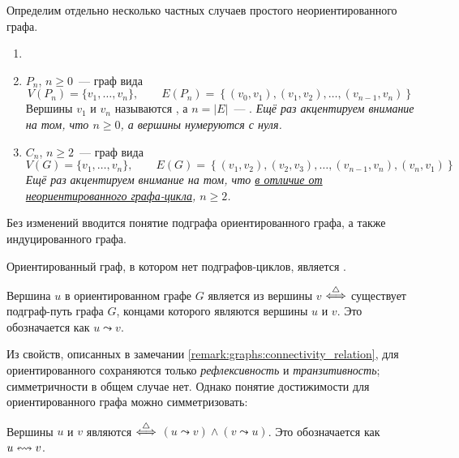 Определим отдельно несколько частных случаев простого неориентированного графа.
\begin{definition}
    \begin{enumerate}[label=\arabic*)]
        \item[]
        \item
             $ P_n $, $ n \geqslant 0 $~--- граф вида
            \[
                V(P_n) = \{ v_1, \ldots, v_n \}, \qquad
                E(P_n) = \left\{ (v_0, v_1), (v_1, v_2), \ldots, (v_{n-1}, v_n) \right\}
            \]
            Вершины $ v_1 $ и $ v_n $ называются , а $ n = |E| $~--- .
            \textit{Ещё раз акцентируем внимание на том, что $ n \geqslant 0 $, а вершины нумеруются с нуля.}
        \item
             $ C_n $, $ n \geqslant 2 $~--- граф вида
            \[
                V(G) = \{ v_1, \ldots, v_n \}, \qquad
                E(G) = \left\{ (v_1, v_2), (v_2, v_3), \ldots, (v_{n-1}, v_n), (v_n, v_1) \right\}
            \]
            \textit{Ещё раз акцентируем внимание на том, что \uline{в отличие от неориентированного графа-цикла}, $ n \geqslant 2 $.}
    \end{enumerate}
\end{definition}

Без изменений вводится понятие подграфа ориентированного графа, а также индуцированного графа.

\begin{definition}
    Ориентированный граф, в котором нет подграфов-циклов, является .
\end{definition}

\begin{definition}
    Вершина $ u $ в ориентированном графе $ G $ является  из вершины $ v $ $ \overset{\triangle}{\Longleftrightarrow} $ существует подграф-путь графа $ G $,
    концами которого являются вершины $ u $ и $ v $.
    Это обозначается как $ u \leadsto v $.
\end{definition}

Из свойств, описанных в замечании \ref{remark:graphs:connectivity_relation},
для ориентированного сохраняются только \emph{рефлексивность} и \emph{транзитивность};
симметричности в общем случае нет.
Однако понятие достижимости для ориентированного графа можно симметризовать:

\begin{definition}
    Вершины $ u $ и $ v $ являются  $ \overset{\triangle}{\Longleftrightarrow} $ $ (u \leadsto v) \wedge (v \leadsto u) $.
    Это обозначается как $ u \leftrightsquigarrow v $.
\end{definition}

